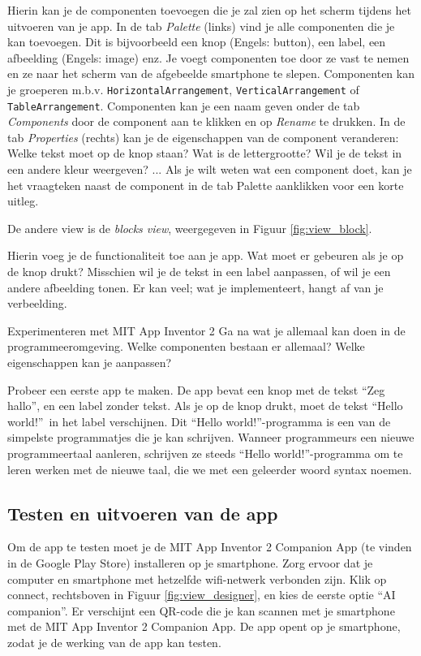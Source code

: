 Hierin kan je de componenten toevoegen die je zal zien op het scherm tijdens het uitvoeren van je app. In de tab \emph{Palette} (links) vind je alle componenten die je kan toevoegen. Dit is bijvoorbeeld een knop (Engels: button), een label, een afbeelding (Engels: image) enz. Je voegt componenten toe door ze vast te nemen en ze naar het scherm van de afgebeelde smartphone te slepen. Componenten kan je groeperen m.b.v. \texttt{HorizontalArrangement}, \texttt{VerticalArrangement} of \texttt{TableArrangement}. Componenten kan je een naam geven onder de tab \emph{Components} door de component aan te klikken en op \emph{Rename} te drukken. In de tab \emph{Properties} (rechts) kan je de eigenschappen van de component veranderen: Welke tekst moet op de knop staan? Wat is de lettergrootte? Wil je de tekst in een andere kleur weergeven? ... Als je wilt weten wat een component doet, kan je het vraagteken naast de component in de tab Palette aanklikken voor een korte uitleg.

De andere view is de \emph{blocks view}, weergegeven in Figuur \ref{fig:view_block}.


Hierin voeg je de functionaliteit toe aan je app. Wat moet er gebeuren als je op de knop drukt? Misschien wil je de tekst in een label aanpassen, of wil je een andere afbeelding tonen. Er kan veel; wat je implementeert, hangt af van je verbeelding.

\begin{opdracht}{Experimenteren met MIT App Inventor 2}
Ga na wat je allemaal kan doen in de programmeeromgeving. Welke componenten bestaan er allemaal? Welke eigenschappen kan je aanpassen?

Probeer een eerste app te maken. De app bevat een knop met de tekst \textquotedblleft Zeg hallo\textquotedblright, en een label zonder tekst. Als je op de knop drukt, moet de tekst \textquotedblleft Hello world!\textquotedblright \ in het label verschijnen. Dit \textquotedblleft Hello world!\textquotedblright-programma is een van de simpelste programmatjes die je kan schrijven. Wanneer programmeurs een nieuwe programmeertaal aanleren, schrijven ze steeds \textquotedblleft Hello world!\textquotedblright-programma om te leren werken met de nieuwe taal, die we met een geleerder woord syntax noemen.
\end{opdracht}

\subsection{Testen en uitvoeren van de app}
Om de app te testen moet je de MIT App Inventor 2 Companion App (te vinden in de Google Play Store) installeren op je smartphone. 
Zorg ervoor dat je computer en smartphone met hetzelfde wifi-netwerk verbonden zijn. 
Klik op connect, rechtsboven in Figuur \ref{fig:view_designer}, en kies de eerste optie \textquotedblleft AI companion\textquotedblright. Er verschijnt een QR-code die je kan scannen met je smartphone met de MIT App Inventor 2 Companion App. De app opent op je smartphone, zodat je de werking van de app kan testen.

